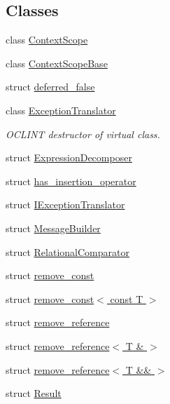 \subsection*{Classes}
\begin{DoxyCompactItemize}
\item 
class \hyperlink{classdoctest_1_1detail_1_1_context_scope}{Context\+Scope}
\item 
class \hyperlink{classdoctest_1_1detail_1_1_context_scope_base}{Context\+Scope\+Base}
\item 
struct \hyperlink{structdoctest_1_1detail_1_1deferred__false}{deferred\+\_\+false}
\item 
class \hyperlink{classdoctest_1_1detail_1_1_exception_translator}{Exception\+Translator}
\begin{DoxyCompactList}\small\item\em O\+C\+L\+I\+NT destructor of virtual class. \end{DoxyCompactList}\item 
struct \hyperlink{structdoctest_1_1detail_1_1_expression_decomposer}{Expression\+Decomposer}
\item 
struct \hyperlink{structdoctest_1_1detail_1_1has__insertion__operator}{has\+\_\+insertion\+\_\+operator}
\item 
struct \hyperlink{structdoctest_1_1detail_1_1_i_exception_translator}{I\+Exception\+Translator}
\item 
struct \hyperlink{structdoctest_1_1detail_1_1_message_builder}{Message\+Builder}
\item 
struct \hyperlink{structdoctest_1_1detail_1_1_relational_comparator}{Relational\+Comparator}
\item 
struct \hyperlink{structdoctest_1_1detail_1_1remove__const}{remove\+\_\+const}
\item 
struct \hyperlink{structdoctest_1_1detail_1_1remove__const_3_01const_01_t_01_4}{remove\+\_\+const$<$ const T $>$}
\item 
struct \hyperlink{structdoctest_1_1detail_1_1remove__reference}{remove\+\_\+reference}
\item 
struct \hyperlink{structdoctest_1_1detail_1_1remove__reference_3_01_t_01_6_01_4}{remove\+\_\+reference$<$ T \& $>$}
\item 
struct \hyperlink{structdoctest_1_1detail_1_1remove__reference_3_01_t_01_6_6_01_4}{remove\+\_\+reference$<$ T \&\& $>$}
\item 
struct \hyperlink{structdoctest_1_1detail_1_1_result}{Result}
\item 

\end{DoxyCompactItemize}
